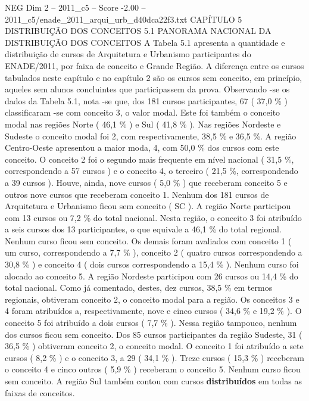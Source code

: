 \begin{textsample}{NEG Dim 2 – 2011\_c5 – Score -2.00 – 2011\_c5/enade\_2011\_arqui\_urb\_d40dca22f3.txt}  \label{ex:f2_neg_088}
CAPÍTULO 5 DISTRIBUIÇÃO DOS CONCEITOS 5.1 PANORAMA NACIONAL DA DISTRIBUIÇÃO DOS CONCEITOS A Tabela 5.1 apresenta a quantidade e distribuição de cursos de Arquitetura e Urbanismo participantes do ENADE/2011, por faixa de conceito e Grande Região.
A diferença entre os cursos tabulados neste capítulo e no capítulo 2 são os cursos sem conceito, em princípio, aqueles sem alunos concluintes que participassem da prova.
Observando -se os dados da Tabela 5.1, nota -se que, dos 181 cursos participantes, 67 ( 37,0 \% ) classificaram -se com conceito 3, o valor modal.
Este foi também o conceito modal nas regiões Norte ( 46,1 \% ) e Sul ( 41,8 \% ).
Nas regiões Nordeste e Sudeste o conceito modal foi 2, com respectivamente, 38,5 \% e 36,5 \%.
A região Centro-Oeste apresentou a maior moda, 4, com 50,0 \% dos cursos com este conceito.
O conceito 2 foi o segundo mais frequente em nível nacional ( 31,5 \%, correspondendo a 57 cursos ) e o conceito 4, o terceiro ( 21,5 \%, correspondendo a 39 cursos ).
Houve, ainda, nove cursos ( 5,0 \% ) que receberam conceito 5 e outros nove cursos que receberam conceito 1.
Nenhum dos 181 cursos de Arquitetura e Urbanismo ficou sem conceito ( SC ).
A região Norte participou com 13 cursos ou 7,2 \% do total nacional.
Nesta região, o conceito 3 foi atribuído a seis cursos dos 13 participantes, o que equivale a 46,1 \% do total regional.
Nenhum curso ficou sem conceito.
Os demais foram avaliados com conceito 1 ( um curso, correspondendo a 7,7 \% ), conceito 2 ( quatro cursos correspondendo a 30,8 \% ) e conceito 4 ( dois cursos correspondendo a 15,4 \% ).
Nenhum curso foi alocado ao conceito 5.
A região Nordeste participou com 26 cursos ou 14,4 \% do total nacional.
Como já comentado, destes, dez cursos, 38,5 \% em termos regionais, obtiveram conceito 2, o conceito modal para a região.
Os conceitos 3 e 4 foram atribuídos a, respectivamente, nove e cinco cursos ( 34,6 \% e 19,2 \% ).
O conceito 5 foi atribuído a dois cursos ( 7,7 \% ).
Nessa região tampouco, nenhum dos cursos ficou sem conceito.
Dos 85 cursos participantes da região Sudeste, 31 ( 36,5 \% ) obtiveram conceito 2, o conceito modal.
O conceito 1 foi atribuído a sete cursos ( 8,2 \% ) e o conceito 3, a 29 ( 34,1 \% ).
Treze cursos ( 15,3 \% ) receberam o conceito 4 e cinco outros ( 5,9 \% ) receberam o conceito 5.
Nenhum curso ficou sem conceito.
A região Sul também contou com cursos \textbf{distribuídos} em todas as faixas de conceitos.

\end{textsample}
